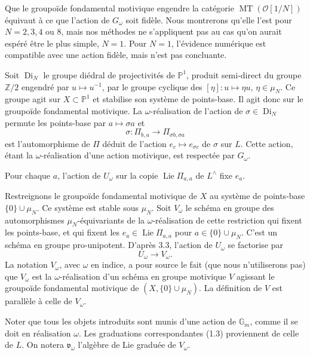 \documentclass[10pt,a4paper]{article}
\newcommand{\Gm}{\mathbb G_m}
\newcommand{\muN}{\mu_N}
\newcommand{\Z}{\mathbb Z}
\newcommand{\Pone}{\mathbb P^1}
\newcommand{\Lie}{\operatorname{Lie}}
\newcommand{\MT}{\operatorname{MT}}
\newcommand{\OO}{\mathcal O}
\newcommand{\vomega}{\mathfrak v_\omega}
\newcommand{\Lhat}{L^{\wedge}}
\theoremstyle{deligne}
\newcommand{\heading}[1]{\vspace{0.65em}\noindent{\bfseries #1}\quad}
\begin{document}
Que le groupoïde fondamental motivique engendre la catégorie \(\MT(\OO[1/N])\) équivaut à ce que l'action de \(G_\omega\) soit fidèle. Nous montrerons qu'elle l'est pour \(N=2,3,4\) ou \(8\), mais nos méthodes ne s'appliquent pas au cas qu'on aurait espéré être le plus simple, \(N=1\). Pour \(N=1\), l'évidence numérique est compatible avec une action fidèle, mais n'est pas concluante.

\heading{3.3.} Soit \(\operatorname{Di}_N\) le groupe diédral de projectivités de \(\Pone\), produit semi-direct du groupe \(\Z/2\) engendré par \(u\mapsto u^{-1}\), par le groupe cyclique des \([\eta]:u\mapsto\eta u\), \(\eta\in\muN\). Ce groupe agit sur \(X\subset\Pone\) et stabilise son système de points-base. Il agit donc sur le groupoïde fondamental motivique. La \(\omega\)-réalisation de l'action de \(\sigma\in\operatorname{Di}_N\) permute les points-base par \(a\mapsto\sigma a\) et
\[
\sigma:\Pi_{b,a}\longrightarrow \Pi_{\sigma b,\sigma a}
\]
est l'automorphisme de \(\Pi\) déduit de l'action \(e_c\mapsto e_{\sigma c}\) de \(\sigma\) sur \(L\). Cette action, étant la \(\omega\)-réalisation d'une action motivique, est respectée par \(G_\omega\).

Pour chaque \(a\), l'action de \(U_\omega\) sur la copie \(\Lie\Pi_{a,a}\) de \(\Lhat\) fixe \(e_a\).

\heading{3.4.} Restreignons le groupoïde fondamental motivique de \(X\) au système de points-base \(\{0\}\cup\muN\). Ce système est stable sous \(\muN\). Soit \(V_\omega\) le schéma en groupe des automorphismes \(\muN\)-équivariants de la \(\omega\)-réalisation de cette restriction qui fixent les points-base, et qui fixent les \(e_a\in\Lie\Pi_{a,a}\) pour \(a\in\{0\}\cup\muN\). C'est un schéma en groupe pro-unipotent. D'après 3.3, l'action de \(U_\omega\) se factorise par
\[
\tag{3.4.1}
U_\omega\longrightarrow V_\omega.
\]
La notation \(V_\omega\), avec \(\omega\) en indice, a pour source le fait (que nous n'utiliserons pas) que \(V_\omega\) est la \(\omega\)-réalisation d'un schéma en groupe motivique \(V\) agissant le groupoïde fondamental motivique de \((X,\{0\}\cup\muN)\). La définition de \(V\) est parallèle à celle de \(V_\omega\).

Noter que tous les objets introduits sont munis d'une action de \(\Gm\), comme il se doit en réalisation \(\omega\). Les graduations correspondantes (1.3) proviennent de celle de \(L\). On notera \(\vomega\) l'algèbre de Lie graduée de \(V_\omega\).
\end{document}
